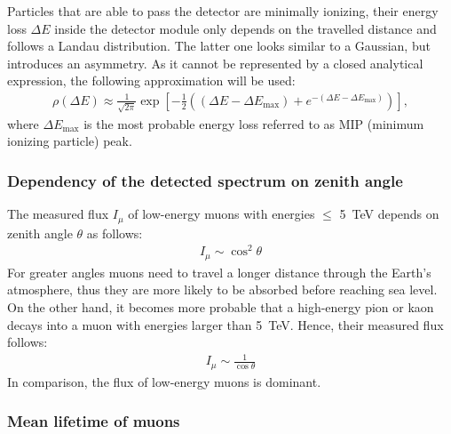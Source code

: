 Particles that are able to pass the detector are minimally ionizing, \ie their energy loss $\Delta E$ inside the detector module only depends on the travelled distance and follows a Landau distribution.
The latter one looks similar to a Gaussian, but introduces an asymmetry.
As it cannot be represented by a closed analytical expression, the following approximation \cite{landau} will be used:
\begin{align}
	\rho(\Delta E)\approx \frac{1}{\sqrt{2\pi}}\exp\left[ -\frac{1}{2}\left( \left(\Delta E-\Delta E_\text{max} \right) +e^{-\left(\Delta E-\Delta E_\text{max} \right)}\right) \right] ,
\end{align} 
where $\Delta E_\text{max}$ is the most probable energy loss referred to as MIP (minimum ionizing particle) peak.

\subsubsection{Dependency of the detected spectrum on zenith angle} \label{DependencyZenithAngle}

The measured flux $I_\mu$ of low-energy muons with energies $\leq$ \SI{5}{\tera\electronvolt} depends on zenith angle $\theta$ as follows:
\begin{align}
	I_\mu \sim \cos^2\theta
\end{align}
For greater angles muons need to travel a longer distance through the Earth's atmosphere, thus they are more likely to be absorbed before reaching sea level.
On the other hand, it becomes more probable that a high-energy pion or kaon decays into a muon with energies larger than \SI{5}{\tera\electronvolt}.
Hence, their measured flux follows:
\begin{align}
	I_\mu \sim \frac{1}{\cos\theta}
\end{align}
In comparison, the flux of low-energy muons is dominant.

\subsubsection{Mean lifetime of muons} \label{MeanLifetimeOfMuons}

